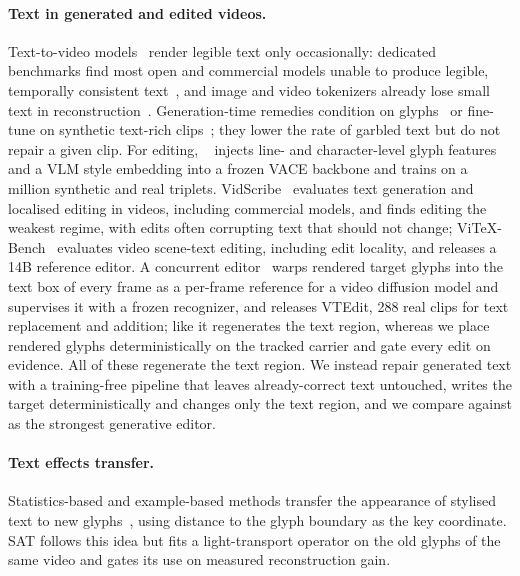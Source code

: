 \paragraph{Text in generated and edited videos.} Text-to-video models~\cite{wan2025wan,yang2025cogvideox,jiang2025vace} render legible text only occasionally: dedicated benchmarks find most open and commercial models unable to produce legible, temporally consistent text~\cite{t2vtextbench2025,vtrbench2026,textvbench2026,avgenbench2026}, and image and video tokenizers already lose small text in reconstruction~\cite{tokbench2025}. Generation-time remedies condition on glyphs~\cite{liu2024textanimator} or fine-tune on synthetic text-rich clips~\cite{vtp2025}; they lower the rate of garbled text but do not repair a given clip. For editing, \steer~\cite{zeng2026steervte} injects line- and character-level glyph features and a VLM style embedding into a frozen VACE backbone and trains on a million synthetic and real triplets. VidScribe~\cite{vidscribe2026} evaluates text generation and localised editing in videos, including commercial models, and finds editing the weakest regime, with edits often corrupting text that should not change; ViTeX-Bench~\cite{vitexbench2026} evaluates video scene-text editing, including edit locality, and releases a 14B reference editor. A concurrent editor~\cite{zhang2026trajglyph} warps rendered target glyphs into the text box of every frame as a per-frame reference for a video diffusion model and supervises it with a frozen recognizer, and releases VTEdit, 288 real clips for text replacement and addition; like \steer it regenerates the text region, whereas we place rendered glyphs deterministically on the tracked carrier and gate every edit on evidence. All of these regenerate the text region. We instead repair generated text with a training-free pipeline that leaves already-correct text untouched, writes the target deterministically and changes only the text region, and we compare against \steer as the strongest generative editor.

\paragraph{Text effects transfer.} Statistics-based and example-based methods transfer the appearance of stylised text to new glyphs~\cite{yang2017awesometypography,men2019dyntypo,yang2019tetgan}, using distance to the glyph boundary as the key coordinate. SAT follows this idea but fits a light-transport operator on the old glyphs of the same video and gates its use on measured reconstruction gain.

